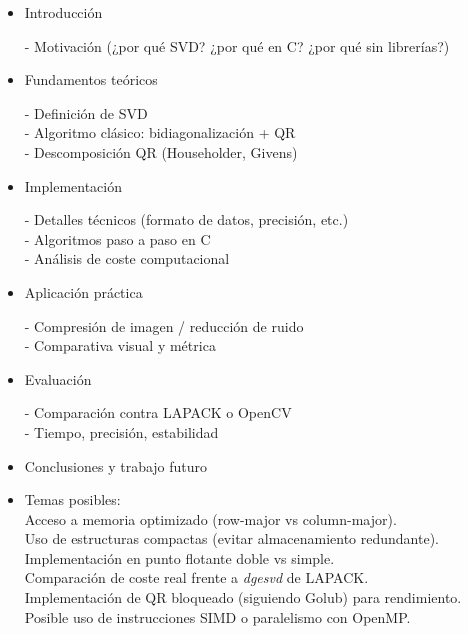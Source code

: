 \documentclass{scrartcl}
\begin{document}
\begin{itemize}
    \item Introducción

   - Motivación (¿por qué SVD? ¿por qué en C? ¿por qué sin librerías?)

    \item Fundamentos teóricos

   - Definición de SVD \\
   - Algoritmo clásico: bidiagonalización + QR \\
   - Descomposición QR (Householder, Givens) \\

    \item Implementación

   - Detalles técnicos (formato de datos, precisión, etc.) \\
   - Algoritmos paso a paso en C \\
   - Análisis de coste computacional \\

    \item Aplicación práctica

   - Compresión de imagen / reducción de ruido \\
   - Comparativa visual y métrica \\

    \item Evaluación

   - Comparación contra LAPACK o OpenCV \\
   - Tiempo, precisión, estabilidad \\

    \item Conclusiones y trabajo futuro
\end{itemize}

\begin{itemize}
    \item Temas posibles: \\
	Acceso a memoria optimizado (row-major vs column-major). \\
	Uso de estructuras compactas (evitar almacenamiento redundante). \\
	Implementación en punto flotante doble vs simple. \\
    Comparación de coste real frente a \textit{dgesvd} de LAPACK. \\
	Implementación de QR bloqueado (siguiendo Golub) para rendimiento. \\
	Posible uso de instrucciones SIMD o paralelismo con OpenMP. \\
\end{itemize}
\end{document}
